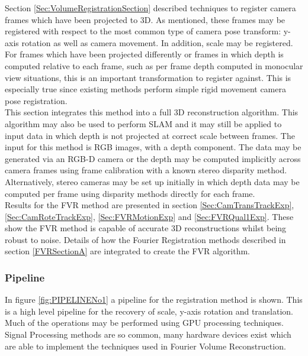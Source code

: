
Section \ref{Sec:VolumeRegistrationSection} described techniques to register camera frames which have been projected to 3D. As mentioned, these frames may be registered with respect to the most common type of camera pose transform: y-axis rotation as well as camera movement. In addition, scale may be registered. For frames which have been projected differently or frames in which depth is computed relative to each frame, such as per frame depth computed in monocular view situations, this is an important transformation to register against. This is especially true since existing methods perform simple rigid movement camera pose registration. \\

This section integrates this method into a full 3D reconstruction algorithm. This algorithm may also be used to perform SLAM and it may still be applied to input data in which depth is not projected at correct scale between frames. The input for this method is RGB images, with a depth component. The data may be generated via an RGB-D camera or the depth may be computed implicitly across camera frames using frame calibration with a known stereo disparity method. Alternatively, stereo cameras may be set up initially in which depth data may be computed per frame using disparity methods directly for each frame. \\

Results for the FVR method are presented in section \ref{Sec:CamTransTrackExp}, \ref{Sec:CamRoteTrackExp}, \ref{Sec:FVRMotionExp} and \ref{Sec:FVRQual1Exp}. These show the FVR method is capable of accurate 3D reconstructions whilst being robust to noise. Details of how the Fourier Registration methods described in section \ref{FVRSectionA} are integrated to create the FVR algorithm. \\


\subsubsection{Pipeline}

\label{sec:FVRPipelineSect}

In figure \ref{fig:PIPELINENo1} a pipeline for the registration method is shown. This is a high level pipeline for the recovery of scale, y-axis rotation and translation. Much of the operations may be performed using GPU processing techniques. Signal Processing methods are so common, many hardware devices exist which are able to implement the techniques used in Fourier Volume Reconstruction. \\


